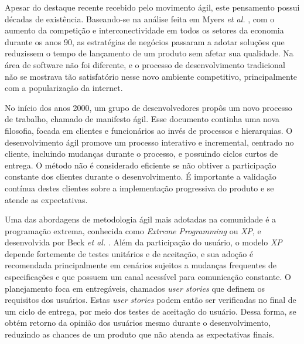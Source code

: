 Apesar do destaque recente recebido pelo movimento ágil, este pensamento possui décadas de existência. Baseando-se na análise feita em Myers \emph{et al.} \cite{myers}, com o aumento da competição e interconectividade em todos os setores da economia durante os anos 90, as estratégias de negócios passaram a adotar soluções que reduzissem o tempo de lançamento de um produto sem afetar sua qualidade. Na área de software não foi diferente, e o processo de desenvolvimento tradicional não se mostrava tão satisfatório nesse novo ambiente competitivo, principalmente com a popularização da internet.

No início dos anos 2000, um grupo de desenvolvedores propôs um novo processo de trabalho, chamado de manifesto ágil. Esse documento continha uma nova filosofia, focada em clientes e funcionários ao invés de processos e hierarquias. O desenvolvimento ágil promove um processo interativo e incremental, centrado no cliente, incluindo mudanças durante o processo, e possuindo ciclos curtos de entrega. O método não é considerado eficiente se não obtiver a participação constante dos clientes durante o desenvolvimento. É importante a validação contínua destes clientes sobre a implementação progressiva do produto e se atende as expectativas.

Uma das abordagens de metodologia ágil mais adotadas na comunidade é a programação extrema, conhecida como \emph{Extreme Programming} ou \emph{XP}, e desenvolvida por Beck \emph{et al.} \cite{beck1}. Além da participação do usuário, o modelo \emph{XP} depende fortemente de testes unitários e de aceitação, e sua adoção é recomendada principalmente em cenários sujeitos a mudanças frequentes de especificações e que possuem um canal acessível para comunicação constante. O planejamento foca em entregáveis, chamados \emph{user stories} que definem os requisitos dos usuários. Estas \emph{user stories} podem então ser verificadas no final de um ciclo de entrega, por meio dos testes de aceitação do usuário. Dessa forma, se obtém retorno da opinião dos usuários mesmo durante o desenvolvimento, reduzindo as chances de um produto que não atenda as expectativas finais.

